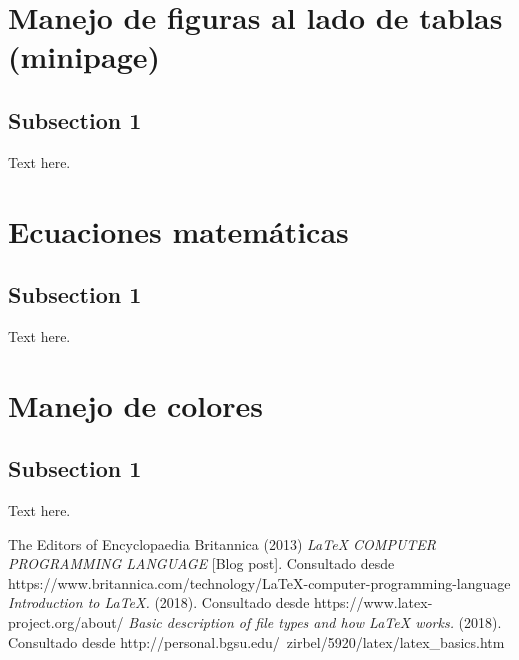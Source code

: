 \documentclass[letterpaper, 10pt, journal]{IEEEtran}
\begin{document}
\section{Manejo de figuras al lado de tablas (minipage)}
\subsection{Subsection 1}
Text here.

\section{Ecuaciones matem\'aticas}
\subsection{Subsection 1}
Text here.

\section{Manejo de colores}
\subsection{Subsection 1}
Text here.


\begin{thebibliography}{1}
\bibitem{[1]}The Editors of Encyclopaedia Britannica  (2013) \emph{LaTeX COMPUTER PROGRAMMING LANGUAGE} [Blog post]. Consultado desde https://www.britannica.com/technology/LaTeX-computer-programming-language
\bibitem{[2]} \emph{Introduction to LaTeX.} (2018). Consultado desde https://www.latex-project.org/about/
\bibitem{[3]} \emph{Basic description of file types and how LaTeX works.} (2018). Consultado desde http://personal.bgsu.edu/~zirbel/5920/latex/latex\_basics.htm



\end{thebibliography}
\end{document}

